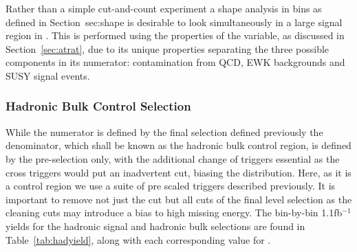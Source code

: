 Rather than a simple cut-and-count experiment a shape analysis in \HT bins as defined in Section~{sec:shape} is desirable to look simultaneously in a large signal region in \HT. This is performed using the properties of the \RaT variable, as discussed in Section~\ref{sec:atrat}, due to its unique properties separating the three possible components in its numerator: contamination from QCD, EWK backgrounds and SUSY signal events.

\subsubsection{Hadronic Bulk Control Selection}
While the numerator is defined by the final selection defined previously the denominator, which shall be known as the hadronic bulk control region, is defined by the pre-selection only, with the additional change of triggers essential as the cross triggers would put an inadvertent \MHT cut, biasing the \alt distribution. Here, as it is a control region we use a suite of pre scaled \HT triggers described previously. It is important to remove not just the \alt cut but all cuts of the final level selection as the cleaning cuts may introduce a bias to high missing energy. The bin-by-bin 1.1fb$^{-1}$ yields for the hadronic signal and hadronic bulk selections are found in Table~\ref{tab:hadyield}, along with each corresponding value for \RaT.

